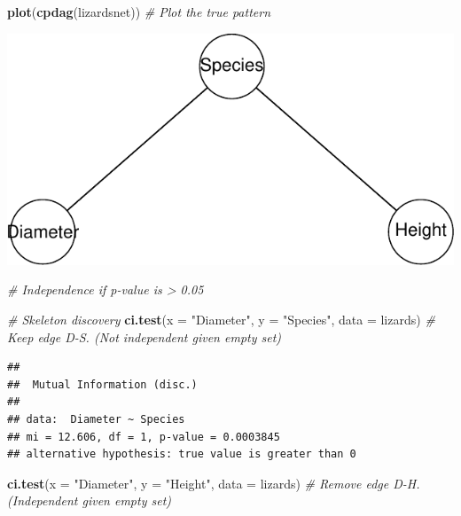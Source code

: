 \documentclass[
]{article}
\newenvironment{Shaded}{\begin{snugshade}}{\end{snugshade}}
\newcommand{\AttributeTok}[1]{\textcolor[rgb]{0.13,0.29,0.53}{#1}}
\newcommand{\CommentTok}[1]{\textcolor[rgb]{0.56,0.35,0.01}{\textit{#1}}}
\newcommand{\FunctionTok}[1]{\textcolor[rgb]{0.13,0.29,0.53}{\textbf{#1}}}
\newcommand{\NormalTok}[1]{#1}
\newcommand{\StringTok}[1]{\textcolor[rgb]{0.31,0.60,0.02}{#1}}
\begin{document}
\begin{Shaded}
\begin{Highlighting}[]
\FunctionTok{plot}\NormalTok{(}\FunctionTok{cpdag}\NormalTok{(lizardsnet)) }\CommentTok{\# Plot the true pattern}
\end{Highlighting}
\end{Shaded}

\includegraphics{jan2021_files/figure-latex/unnamed-chunk-1-2.pdf}

\begin{Shaded}
\begin{Highlighting}[]
\CommentTok{\# Independence if p{-}value is \textgreater{} 0.05}

\CommentTok{\# Skeleton discovery}
\FunctionTok{ci.test}\NormalTok{(}\AttributeTok{x =} \StringTok{"Diameter"}\NormalTok{, }\AttributeTok{y =} \StringTok{"Species"}\NormalTok{, }\AttributeTok{data =}\NormalTok{ lizards)  }\CommentTok{\# Keep edge D{-}S. (Not independent given empty set)}
\end{Highlighting}
\end{Shaded}

\begin{verbatim}
## 
##  Mutual Information (disc.)
## 
## data:  Diameter ~ Species  
## mi = 12.606, df = 1, p-value = 0.0003845
## alternative hypothesis: true value is greater than 0
\end{verbatim}

\begin{Shaded}
\begin{Highlighting}[]
\FunctionTok{ci.test}\NormalTok{(}\AttributeTok{x =} \StringTok{"Diameter"}\NormalTok{, }\AttributeTok{y =} \StringTok{"Height"}\NormalTok{, }\AttributeTok{data =}\NormalTok{ lizards)   }\CommentTok{\# Remove edge D{-}H. (Independent given empty set)}
\end{Highlighting}
\end{Shaded}
\end{document}
